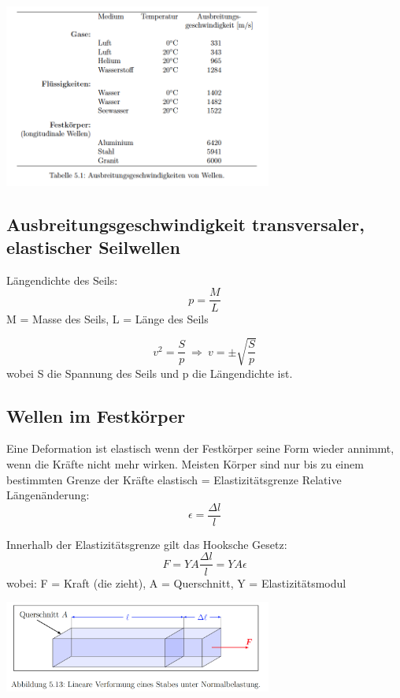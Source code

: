 \documentclass[7pt]{article}
\begin{document}
\begin{multicols*}{3}
\begin{center}
	\includegraphics[width=250pt]{images/wellenausbreitungsgeschwindigkeit.png}
\end{center}

\columnbreak

\subsection{Ausbreitungsgeschwindigkeit transversaler, elastischer Seilwellen}
L{\"a}ngendichte des Seils:
\begin{equation*}
 p = \frac{M}{L}
\end{equation*}
M = Masse des Seils, L = L{\"a}nge des Seils\newline

\begin{equation*}
 v^2 = \frac{S}{p} \> \Longrightarrow \> v = \pm \sqrt{\frac{S}{p}}
\end{equation*}
wobei S die Spannung des Seils und p die L{\"a}ngendichte ist.
\newline 
 
\subsection{Wellen im Festk{\"o}rper}
Eine Deformation ist elastisch wenn der Festk{\"o}rper seine Form wieder annimmt, wenn die Kr{\"a}fte nicht mehr wirken.
\newline
Meisten K{\"o}rper sind nur bis zu einem bestimmten Grenze der Kr{\"a}fte elastisch = Elastizit{\"a}tsgrenze \newline
Relative L{\"a}ngen{\"a}nderung:
\begin{equation*}
\epsilon = \frac{\Delta l }{l}
\end{equation*}

Innerhalb der Elastizitätsgrenze gilt das Hooksche Gesetz:
\begin{equation*}
F = YA \frac{\Delta l}{l} = YA\epsilon
\end{equation*}
wobei: F = Kraft (die zieht), A = Querschnitt, Y = Elastizitätsmodul
\newline
\begin{center}
	\includegraphics[width=250pt]{images/elastizitaetsmodul.png}
\end{center}


\end{multicols*}
\end{document}
